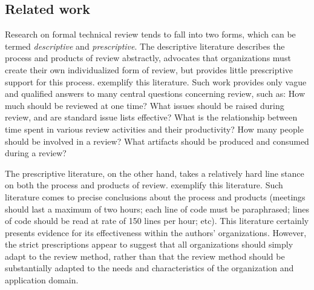 
\subsection{Related work}
\label{sec:external-research}

Research on formal technical review tends to fall into two forms, which can
be termed {\em descriptive}\/ and {\em prescriptive}.  The descriptive
literature describes the process and products of review abstractly,
advocates that organizations must create their own individualized form of
review, but provides little prescriptive support for this process.
\cite{Schulmeyer87,Dunn90,Freedman90} exemplify this literature.  Such work
provides only vague and qualified answers to many central questions
concerning review, such as: How much should be reviewed at one time? What
issues should be raised during review, and are standard issue lists
effective? What is the relationship between time spent in various review
activities and their productivity? How many people should be involved in a
review? What artifacts should be produced and consumed during a review?

The prescriptive literature, on the other hand, takes a relatively hard
line stance on both the process and products of review.
\cite{Fagan76,Fagan86,Russell91} exemplify this literature.  Such
literature comes to precise conclusions about the process and products
(meetings should last a maximum of two hours; each line of code must be
paraphrased; lines of code should be read at rate of 150 lines per hour;
etc).  This literature certainly presents evidence for its effectiveness
within the authors' organizations.  However, the strict prescriptions
appear to suggest that all organizations should simply adapt to the review
method, rather than that the review method should be substantially adapted
to the needs and characteristics of the organization and application
domain.

